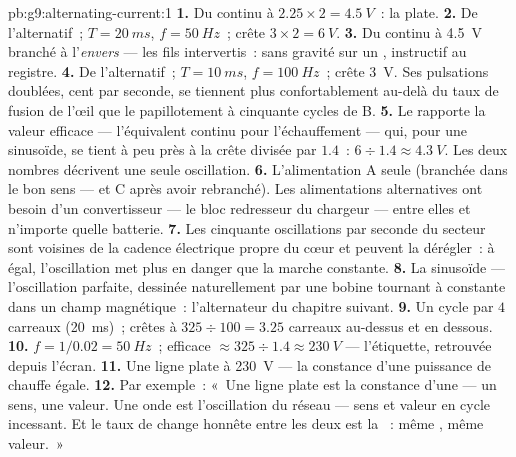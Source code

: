 \begin{solution}{pb:g9:alternating-current:1}
\textbf{1.} Du continu à $2.25 \times 2 = \qty{4.5}{V}$~: la 
plate.
\textbf{2.} De l'alternatif~; $T = \qty{20}{ms}$,
$f = \qty{50}{Hz}$~; crête $3 \times 2 = \qty{6}{V}$.
\textbf{3.} Du continu à \qty{4.5}{V} branché à l'\emph{envers} ---
les fils intervertis~: sans gravité sur un , instructif au
registre.
\textbf{4.} De l'alternatif~; $T = \qty{10}{ms}$,
$f = \qty{100}{Hz}$~; crête \qty{3}{V}. Ses pulsations doublées, cent
par seconde, se tiennent plus confortablement au-delà du taux de
fusion de l'œil que le papillotement à cinquante cycles de B.
\textbf{5.} Le  rapporte la valeur efficace --- l'équivalent
continu pour l'échauffement --- qui, pour une sinusoïde, se tient à
peu près à la crête divisée par $1.4$~:
$6 \div 1.4 \approx \qty{4.3}{V}$. Les deux nombres décrivent une
seule oscillation.
\textbf{6.} L'alimentation A seule (branchée dans le bon sens --- et C
après avoir rebranché). Les alimentations alternatives ont besoin d'un
convertisseur --- le bloc redresseur du chargeur --- entre elles et
n'importe quelle batterie.
\textbf{7.} Les cinquante oscillations par seconde du secteur sont
voisines de la cadence électrique propre du cœur et peuvent la
dérégler~: à  égal, l'oscillation met plus en danger que la
marche constante.
\textbf{8.} La sinusoïde --- l'oscillation parfaite, dessinée
naturellement par une bobine tournant à  constante dans un
champ magnétique~: l'alternateur du chapitre suivant.
\textbf{9.} Un cycle par $4$ carreaux (\qty{20}{ms})~; crêtes à
$325 \div 100 = 3.25$ carreaux au-dessus et en dessous.
\textbf{10.} $f = 1/0.02 = \qty{50}{Hz}$~; efficace
$\approx 325 \div 1.4 \approx \qty{230}{V}$ --- l'étiquette,
retrouvée depuis l'écran.
\textbf{11.} Une ligne plate à \qty{230}{V} --- la constance d'une
puissance de chauffe égale.
\textbf{12.} Par exemple~: «~Une ligne plate est la constance d'une
 --- un sens, une valeur. Une onde est l'oscillation du réseau ---
sens et valeur en cycle incessant. Et le taux de change honnête entre
les deux est la ~: même , même valeur.~»
\end{solution}

